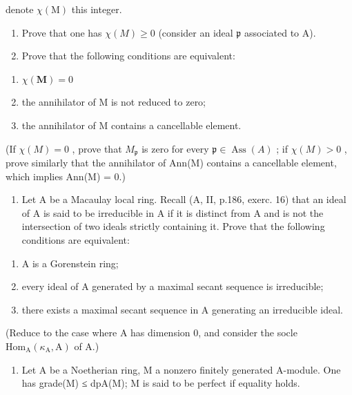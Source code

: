 denote \(\chi(\mathrm{M})\) this integer.

\begin{enumerate}
\def\labelenumi{\alph{enumi})}
\setcounter{enumi}{1}
\item
  Prove that one has \(\chi(M) \geqslant 0\) (consider an ideal \(\mathfrak{p}\) associated to A).
\item
  Prove that the following conditions are equivalent:
\end{enumerate}

\begin{enumerate}
\def\labelenumi{(\roman{enumi})}
\item
  \(\chi (\mathbf{M}) = 0\)
\item
  the annihilator of M is not reduced to zero;
\item
  the annihilator of M contains a cancellable element.
\end{enumerate}

(If \(\chi(M) = 0\) , prove that \(M_{\mathfrak{p}}\) is zero for every \(\mathfrak{p} \in \operatorname{Ass}(A)\) ; if \(\chi(M) > 0\) , prove similarly that the annihilator of Ann(M) contains a cancellable element, which implies Ann(M) = 0.)

\begin{enumerate}
\def\labelenumi{\arabic{enumi})}
\setcounter{enumi}{2}
\tightlist
\item
  Let A be a Macaulay local ring. Recall (A, II, p.186, exerc. 16) that an ideal of A is said to be irreducible in A if it is distinct from A and is not the intersection of two ideals strictly containing it. Prove that the following conditions are equivalent:
\end{enumerate}

\begin{enumerate}
\def\labelenumi{(\roman{enumi})}
\item
  A is a Gorenstein ring;
\item
  every ideal of A generated by a maximal secant sequence is irreducible;
\item
  there exists a maximal secant sequence in A generating an irreducible ideal.
\end{enumerate}

(Reduce to the case where A has dimension 0, and consider the socle \(\mathrm{Hom}_{\mathrm{A}}(\kappa_{\mathrm{A}},\mathrm{A})\) of A.)

\begin{enumerate}
\def\labelenumi{\arabic{enumi})}
\setcounter{enumi}{3}
\tightlist
\item
  Let A be a Noetherian ring, M a nonzero finitely generated A-module. One has grade(M) ≤ dpA(M); M is said to be perfect if equality holds.
\end{enumerate}


